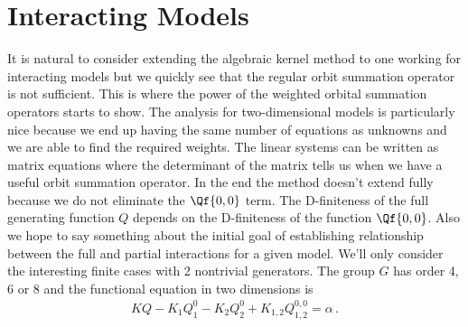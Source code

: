 \section{Interacting Models}
It is natural to consider extending the algebraic kernel method to one working for interacting models but we quickly see that the regular orbit summation operator is not sufficient. This is where the power of the weighted orbital summation operators starts to show. The analysis for two-dimensional models is particularly nice because we end up having the same number of equations as unknowns and we are able to find the required weights. The linear systems can be written as matrix equations where the determinant of the matrix tells us when we have a useful orbit summation operator. In the end the method doesn't extend fully because we do not eliminate the $\Qf{0,0}$ term. The D-finiteness of the full generating function $Q$ depends on the D-finiteness of the function $\Qf{0,0}$. Also we hope to say something about the initial goal of establishing relationship between the full and partial interactions for a given model. We'll only consider the interesting finite cases with 2 nontrivial generators. The group $G$ has order 4, 6 or 8 and the functional equation in two dimensions is
\begin{align}
	KQ  - K_1 Q_1^0 -  K_2 Q_2^0 + K_{1,2}Q_{1,2}^{0,0} = \alpha\,.
\end{align}

